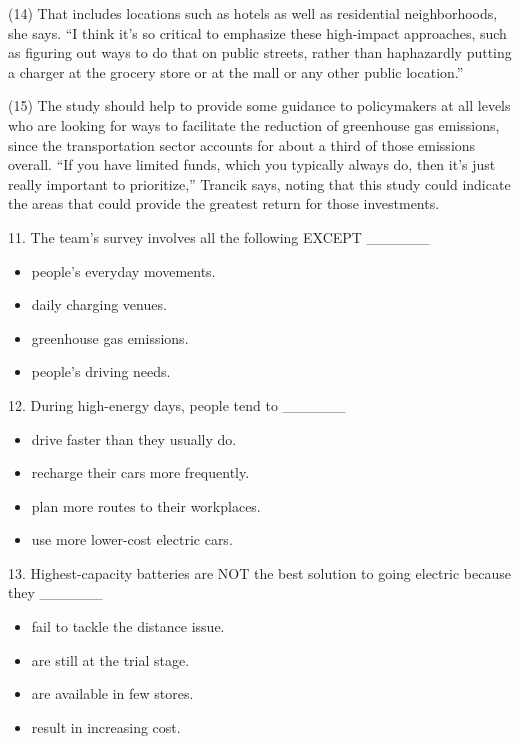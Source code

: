 \documentclass[UTF8,11pt]{ctexart}
\begin{document}
(14) That includes locations such as hotels as well as residential neighborhoods, she says. “I think it’s so critical to emphasize these high-impact approaches, such as figuring out ways to do that on public streets, rather than haphazardly putting a charger at the grocery store or at the mall or any other public location.”


(15) The study should help to provide some guidance to policymakers at all levels who are looking for ways to facilitate the reduction of greenhouse gas emissions, since the transportation sector accounts for about a third of those emissions overall. “If you have limited funds, which you typically always do, then it’s just really important to prioritize,” Trancik says, noting that this study could indicate the areas that could provide the greatest return for those investments.


11. The team’s survey involves all the following EXCEPT \_\_\_\_\_\_


\begin{itemize}[leftmargin=2em,itemsep=.2em,topsep=.4em]\item[A.] people’s everyday movements.
\item[B.] daily charging venues.
\item[C.] greenhouse gas emissions.
\item[D.] people’s driving needs.
\end{itemize}

12. During high-energy days, people tend to \_\_\_\_\_\_


\begin{itemize}[leftmargin=2em,itemsep=.2em,topsep=.4em]\item[A.] drive faster than they usually do.
\item[B.] recharge their cars more frequently.
\item[C.] plan more routes to their workplaces.
\item[D.] use more lower-cost electric cars.
\end{itemize}

13. Highest-capacity batteries are NOT the best solution to going electric because they \_\_\_\_\_\_


\begin{itemize}[leftmargin=2em,itemsep=.2em,topsep=.4em]\item[A.] fail to tackle the distance issue.
\item[B.] are still at the trial stage.
\item[C.] are available in few stores.
\item[D.] result in increasing cost.
\end{itemize}
\end{document}
